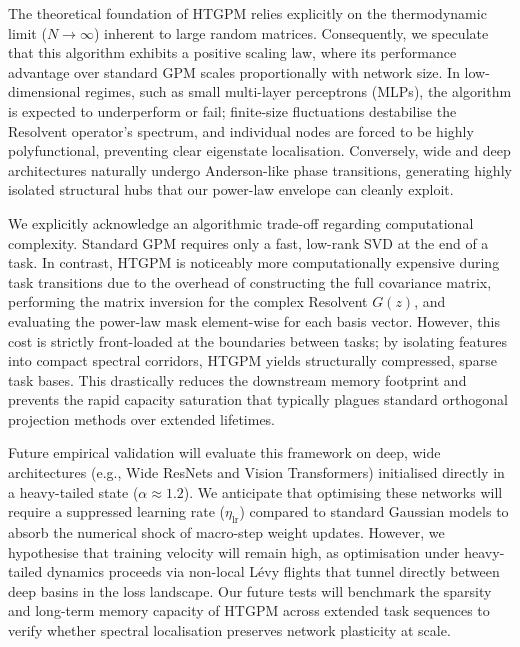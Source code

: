 \documentclass[10pt,a4paper]{article}
\begin{document}
	The theoretical foundation of HTGPM relies explicitly on the thermodynamic limit ($N \to \infty$) inherent to large random matrices. Consequently, we speculate that this algorithm exhibits a positive scaling law, where its performance advantage over standard GPM scales proportionally with network size. In low-dimensional regimes, such as small multi-layer perceptrons (MLPs), the algorithm is expected to underperform or fail; finite-size fluctuations destabilise the Resolvent operator's spectrum, and individual nodes are forced to be highly polyfunctional, preventing clear eigenstate localisation. Conversely, wide and deep architectures naturally undergo Anderson-like phase transitions, generating highly isolated structural hubs that our power-law envelope can cleanly exploit. 
	
	We explicitly acknowledge an algorithmic trade-off regarding computational complexity. Standard GPM requires only a fast, low-rank SVD at the end of a task. In contrast, HTGPM is noticeably more computationally expensive during task transitions due to the overhead of constructing the full covariance matrix, performing the matrix inversion for the complex Resolvent $G(z)$, and evaluating the power-law mask element-wise for each basis vector. However, this cost is strictly front-loaded at the boundaries between tasks; by isolating features into compact spectral corridors, HTGPM yields structurally compressed, sparse task bases. This drastically reduces the downstream memory footprint and prevents the rapid capacity saturation that typically plagues standard orthogonal projection methods over extended lifetimes.
	
	Future empirical validation will evaluate this framework on deep, wide architectures (e.g., Wide ResNets and Vision Transformers) initialised directly in a heavy-tailed state ($\alpha \approx 1.2$). We anticipate that optimising these networks will require a suppressed learning rate ($\eta_{\text{lr}}$) compared to standard Gaussian models to absorb the numerical shock of macro-step weight updates. However, we hypothesise that training velocity will remain high, as optimisation under heavy-tailed dynamics proceeds via non-local Lévy flights that tunnel directly between deep basins in the loss landscape. Our future tests will benchmark the sparsity and long-term memory capacity of HTGPM across extended task sequences to verify whether spectral localisation preserves network plasticity at scale.
	
	\newpage
\end{document}
